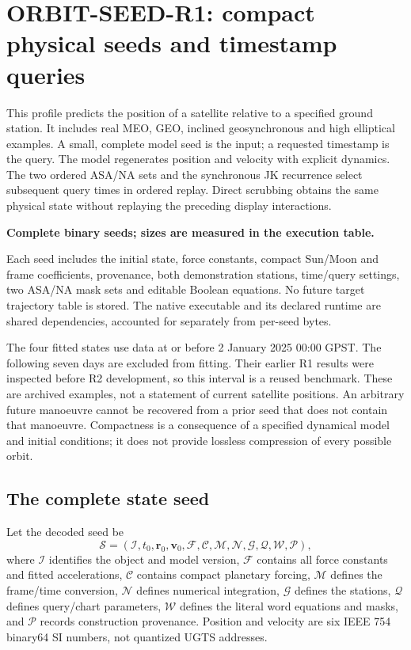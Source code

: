 \section{ORBIT-SEED-R1: compact physical seeds and timestamp queries}
\label{sec:orbit}
This profile predicts the position of a satellite relative to a specified ground
station. It includes real MEO, GEO, inclined geosynchronous and high elliptical
examples. A small, complete model seed is the input; a requested timestamp is the
query. The model regenerates position and velocity with explicit dynamics. The
two ordered ASA/NA sets and the synchronous JK recurrence select subsequent
query times in ordered replay. Direct scrubbing obtains the same physical state
without replaying the preceding display interactions.

\begin{panel}
\textbf{Complete binary seeds; sizes are measured in the execution table.}\par
Each seed includes the initial state, force constants, compact Sun/Moon and frame
coefficients, provenance, both demonstration stations, time/query settings,
two ASA/NA mask sets and editable Boolean equations. No future target trajectory
table is stored. The native executable and its declared runtime are shared
dependencies, accounted for separately from per-seed bytes.
\end{panel}

The four fitted states use data at or before 2 January 2025 00:00 GPST. The
following seven days are excluded from fitting. Their earlier R1 results were
inspected before R2 development, so this interval is a reused benchmark.
These are archived examples,
not a statement of current satellite positions. An arbitrary future manoeuvre
cannot be recovered from a prior seed that does not contain that manoeuvre.
Compactness is a consequence of a specified dynamical model and initial
conditions; it does not provide lossless compression of every possible orbit.

\subsection{The complete state seed}
Let the decoded seed be
\begin{equation}
\mathcal S=(\mathcal I,t_0,\mathbf r_0,\mathbf v_0,\mathcal F,
\mathcal C,\mathcal M,\mathcal N,\mathcal G,\mathcal Q,\mathcal W,\mathcal P),
\end{equation}
where $\mathcal I$ identifies the object and model version, $\mathcal F$ contains
all force constants and fitted accelerations, $\mathcal C$ contains compact
planetary forcing, $\mathcal M$ defines the frame/time conversion,
$\mathcal N$ defines numerical integration, $\mathcal G$ defines the stations,
$\mathcal Q$ defines query/chart parameters, $\mathcal W$ defines the literal word
equations and masks, and $\mathcal P$ records construction provenance. Position
and velocity are six IEEE 754 binary64 SI numbers, not quantized UGTS addresses.

